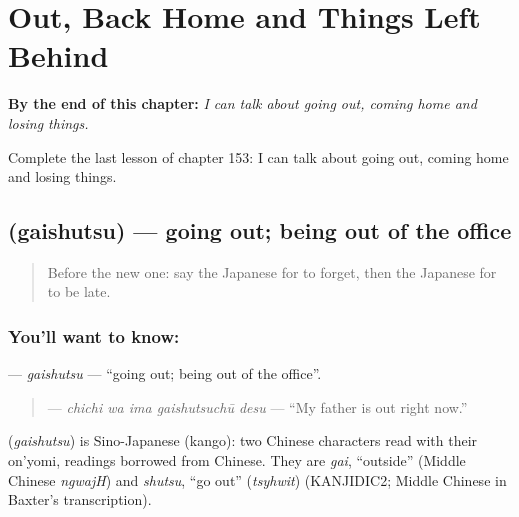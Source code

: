 
\chapter{Out, Back Home and Things Left Behind}
\label{ch:ja-out-back-home-and-things-left-behind}

\begin{chapteropening}
\textbf{By the end of this chapter:} \emph{I can talk about going out, coming home and losing things.}

Complete the last lesson of chapter 153: I can talk about going out, coming home and losing things.
\end{chapteropening}

\section[\texorpdfstring{\ja{がいしゅつ} (gaishutsu)}{がいしゅつ (gaishutsu)}]{ (gaishutsu) — going out; being out of the office}

\label{lesson:JA-C153-gaishutsu}



\begin{quote}
Before the new one: say the Japanese for to forget, then the Japanese for to be late.
\end{quote}

\subsection*{You'll want to know: }
\textbf{} — \emph{gaishutsu} — \textquotedblleft{}going out; being out of the office\textquotedblright{}.

\begin{quote}
\textbf{  } — \emph{chichi wa ima gaishutsuchū desu} — \textquotedblleft{}My father is out right now.\textquotedblright{}
\end{quote}

\begin{cousinweb}
\textbf{} (\emph{gaishutsu}) is Sino-Japanese (kango): two Chinese characters read with their on'yomi, readings borrowed from Chinese. They are \emph{gai}, \textquotedblleft{}outside\textquotedblright{} (Middle Chinese \emph{ngwajH}) and \emph{shutsu}, \textquotedblleft{}go out\textquotedblright{} (\emph{tsyhwit}) (KANJIDIC2; Middle Chinese in Baxter's transcription).
\end{cousinweb}

